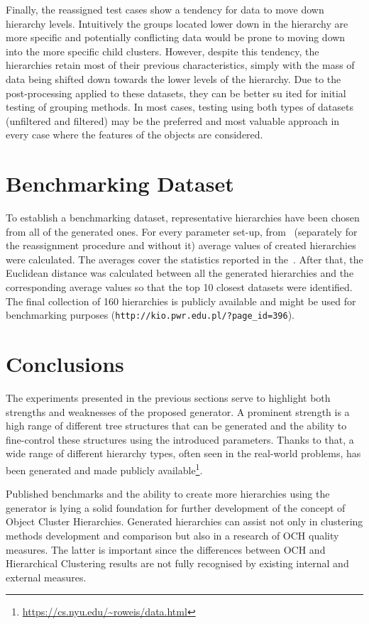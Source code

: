 \documentclass{article}
\begin{document}
    Finally, the reassigned test cases show a tendency for data to move down hierarchy levels. Intuitively the groups located lower down in the hierarchy are more specific and potentially conflicting data would be prone to moving down into the more specific child clusters. However, despite this tendency, the hierarchies retain most of their previous characteristics, simply with the mass of data being shifted down towards the lower levels of the hierarchy. Due to the post-processing applied to these datasets, they can be better su	ited for initial testing of grouping methods. In most cases, testing using both types of datasets (unfiltered and filtered) may be the preferred and most valuable approach in every case where the features of the objects are considered. 
    
	\section{Benchmarking Dataset}
    \label{sec:benchmarking_dataset}
    To establish a benchmarking dataset, representative hierarchies have been chosen from all of the generated ones. For every parameter set-up, from~ (separately for the reassignment procedure and without it) average values of created hierarchies were calculated. The averages cover the statistics reported in the~. After that, the Euclidean distance was calculated between all the generated hierarchies and the corresponding average values so that the top 10 closest datasets were identified. The final collection of 160 hierarchies is publicly available and might be used for benchmarking purposes (\texttt{http://kio.pwr.edu.pl/?page\_id=396}).
	\section{Conclusions}
	\label{conclusion}
	The experiments presented in the previous sections serve to highlight both strengths and weaknesses of the proposed generator. A prominent strength is a high range of different tree structures that can be generated and the ability to fine-control these structures using the introduced parameters. Thanks to that, a wide range of different hierarchy types, often seen in the real-world problems, has been generated and made publicly available\footnote{\url{https://cs.nyu.edu/~roweis/data.html}}. 
	
	Published benchmarks and the ability to create more hierarchies using the generator is lying a solid foundation for further development of the concept of Object Cluster Hierarchies. Generated hierarchies can assist not only in clustering methods development and comparison but also in a research of OCH quality measures. The latter is important since the differences between OCH and Hierarchical Clustering results are not fully recognised by existing internal and external measures. 
	
\end{document}
